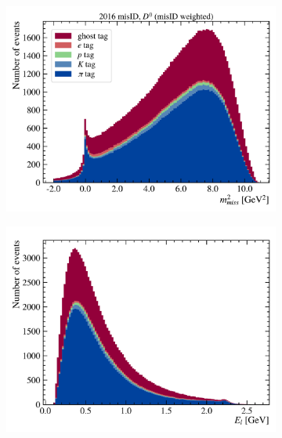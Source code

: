 \begin{figure}[htb]
    \centering
    \begin{subfigure}[b]{0.32\textwidth}
        \centering
        \includegraphics[width=\textwidth]{figs-fit-fit-templates/data-driven-plots/misid/D0_mm2.pdf}
    \end{subfigure}
    \hfill
    \begin{subfigure}[b]{0.32\textwidth}
        \centering
        \includegraphics[width=\textwidth]{figs-fit-fit-templates/data-driven-plots/misid/D0_el}
    \end{subfigure}

\end{figure}
